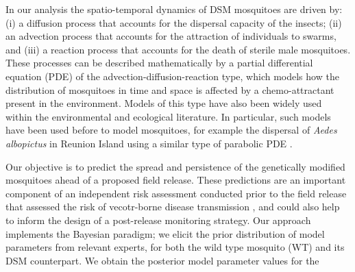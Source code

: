 \documentclass[]{bmcart}
\begin{document}

In our analysis the spatio-temporal dynamics of DSM mosquitoes are driven by: (i) a diffusion process that accounts for the dispersal capacity of the insects; (ii) an advection process that accounts for the attraction of individuals to swarms, and (iii) a reaction process that accounts for the death of sterile male mosquitoes. These processes can be described mathematically by a partial differential equation (PDE) of the advection-diffusion-reaction type, which models how the distribution of mosquitoes in time and space is affected by a chemo-attractant present in the environment. Models of this type have also been widely used within the environmental and ecological literature. In particular, such models have been used before to model mosquitoes, for example the dispersal of \emph{Aedes albopictus} in Reunion Island using a similar type of parabolic PDE \citep{Dufourd2012}.

Our objective is to predict the spread and persistence of the genetically modified mosquitoes ahead of a proposed field release. These predictions are an important component of an independent risk assessment conducted prior to the field release \cite{Hayes2015a} that assessed the risk of vecotr-borne disease transmission \cite{Hosack2020}, and could also help to inform the design of a post-release monitoring strategy. Our approach implements the Bayesian paradigm; we elicit the prior distribution of model parameters from relevant experts, for both the wild type mosquito (WT) and its DSM counterpart. We obtain the posterior model parameter values for the 
\end{document}
